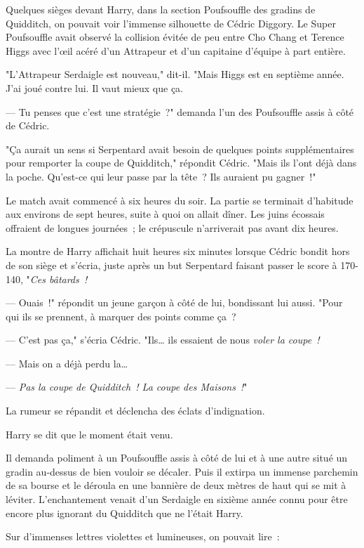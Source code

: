 Quelques sièges devant Harry, dans la section Poufsouffle des gradins de Quidditch, on pouvait voir l'immense silhouette de Cédric Diggory. Le Super Poufsouffle avait observé la collision évitée de peu entre Cho Chang et Terence Higgs avec l'œil acéré d'un Attrapeur et d'un capitaine d'équipe à part entière.

"L'Attrapeur Serdaigle est nouveau," dit-il. "Mais Higgs est en septième année. J'ai joué contre lui. Il vaut mieux que ça.

--- Tu penses que c'est une stratégie~?" demanda l'un des Poufsouffle assis à côté de Cédric.

"Ça aurait un sens si Serpentard avait besoin de quelques points supplémentaires pour remporter la coupe de Quidditch," répondit Cédric. "Mais ils l'ont déjà dans la poche. Qu'est-ce qui leur passe par la tête~? Ils auraient pu gagner~!"

Le match avait commencé à six heures du soir. La partie se terminait d'habitude aux environs de sept heures, suite à quoi on allait dîner. Les juins écossais offraient de longues journées~; le crépuscule n'arriverait pas avant dix heures.

La montre de Harry affichait huit heures six minutes lorsque Cédric bondit hors de son siège et s'écria, juste après un but Serpentard faisant passer le score à 170-140, "\emph{Ces bâtards~!}

--- Ouais~!" répondit un jeune garçon à côté de lui, bondissant lui aussi. "Pour qui ils se prennent, à marquer des points comme ça~?

--- C'est pas ça," s'écria Cédric. "Ils… ils essaient de nous \emph{voler la coupe~!}

--- Mais on a déjà perdu la…

--- \emph{Pas la coupe de Quidditch~! La coupe des Maisons~!}"

La rumeur se répandit et déclencha des éclats d'indignation.

Harry se dit que le moment était venu.

Il demanda poliment à un Poufsouffle assis à côté de lui et à une autre situé un gradin au-dessus de bien vouloir se décaler. Puis il extirpa un immense parchemin de sa bourse et le déroula en une bannière de deux mètres de haut qui se mit à léviter. L'enchantement venait d'un Serdaigle en sixième année connu pour être encore plus ignorant du Quidditch que ne l'était Harry.

Sur d'immenses lettres violettes et lumineuses, on pouvait lire~:

